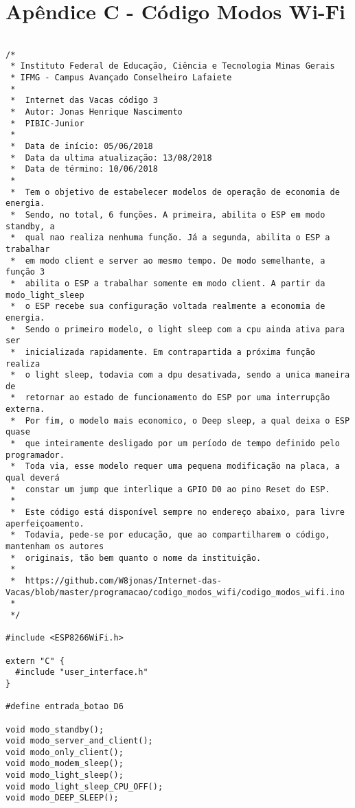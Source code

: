 \newpage
\section{Apêndice C - Código Modos Wi-Fi}
\label{sc:apendice_c_}


\begin{lstlisting}

/*
 * Instituto Federal de Educação, Ciência e Tecnologia Minas Gerais
 * IFMG - Campus Avançado Conselheiro Lafaiete 
 * 
 *  Internet das Vacas código 3
 *  Autor: Jonas Henrique Nascimento
 *  PIBIC-Junior
 * 
 *  Data de início: 05/06/2018
 *  Data da ultima atualização: 13/08/2018
 *  Data de término: 10/06/2018
 *  
 *  Tem o objetivo de estabelecer modelos de operação de economia de energia.
 *  Sendo, no total, 6 funções. A primeira, abilita o ESP em modo standby, a 
 *  qual nao realiza nenhuma função. Já a segunda, abilita o ESP a trabalhar
 *  em modo client e server ao mesmo tempo. De modo semelhante, a função 3
 *  abilita o ESP a trabalhar somente em modo client. A partir da modo_light_sleep
 *  o ESP recebe sua configuração voltada realmente a economia de energia. 
 *  Sendo o primeiro modelo, o light sleep com a cpu ainda ativa para ser 
 *  inicializada rapidamente. Em contrapartida a próxima função realiza
 *  o light sleep, todavia com a dpu desativada, sendo a unica maneira de
 *  retornar ao estado de funcionamento do ESP por uma interrupção externa.
 *  Por fim, o modelo mais economico, o Deep sleep, a qual deixa o ESP quase
 *  que inteiramente desligado por um período de tempo definido pelo programador.
 *  Toda via, esse modelo requer uma pequena modificação na placa, a qual deverá
 *  constar um jump que interlique a GPIO D0 ao pino Reset do ESP.
 * 
 *  Este código está disponível sempre no endereço abaixo, para livre aperfeiçoamento. 
 *  Todavia, pede-se por educação, que ao compartilharem o código, mantenham os autores
 *  originais, tão bem quanto o nome da instituição.
 *  
 *  https://github.com/W8jonas/Internet-das-Vacas/blob/master/programacao/codigo_modos_wifi/codigo_modos_wifi.ino
 *  
 */

#include <ESP8266WiFi.h>

extern "C" {
  #include "user_interface.h"
}

#define entrada_botao D6

void modo_standby();
void modo_server_and_client();
void modo_only_client();
void modo_modem_sleep();
void modo_light_sleep();
void modo_light_sleep_CPU_OFF();
void modo_DEEP_SLEEP();


\end{lstlisting}
